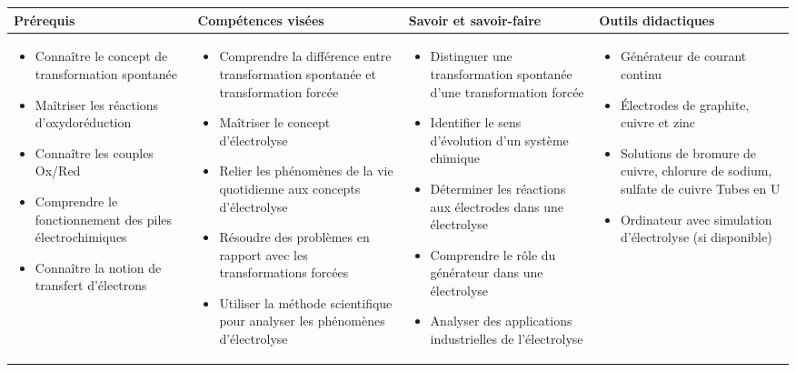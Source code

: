 \documentclass[12pt]{article}
\begin{document}
\begin{tabular}{|p{4.5cm}|p{4.5cm}|p{4.5cm}|p{3cm}|}
\hline
\rowcolor{lightblue}
  \textbf{Prérequis} & \textbf{Compétences visées}& \textbf{Savoir et savoir-faire} & \textbf{Outils didactiques} \\
\hline
\hline
\begin{itemize}[leftmargin=*]
  \item Connaître le concept de transformation spontanée
  \item Maîtriser les réactions d'oxydoréduction
  \item Connaître les couples Ox/Red
  \item Comprendre le fonctionnement des piles électrochimiques
  \item Connaître la notion de transfert d'électrons
\end{itemize}
&
\begin{itemize}[leftmargin=*]
  \item Comprendre la différence entre transformation spontanée et transformation forcée
  \item Maîtriser le concept d'électrolyse
  \item Relier les phénomènes de la vie quotidienne aux concepts d'électrolyse
  \item Résoudre des problèmes en rapport avec les transformations forcées
  \item Utiliser la méthode scientifique pour analyser les phénomènes d'électrolyse
\end{itemize} 
&
\begin{itemize}[leftmargin=*]
\item Distinguer une transformation spontanée d'une transformation forcée
\item Identifier le sens d'évolution d'un système chimique
\item Déterminer les réactions aux électrodes dans une électrolyse
\item Comprendre le rôle du générateur dans une électrolyse
\item Analyser des applications industrielles de l'électrolyse
\end{itemize}
&
\begin{itemize}[leftmargin=*]
  \item Générateur de courant continu
  \item Électrodes de graphite, cuivre et zinc
  \item Solutions de bromure de cuivre, chlorure de sodium, sulfate de cuivre
Tubes en U
      \item Ordinateur avec simulation d'électrolyse
(si disponible)
\end{itemize}

  \\
\hline
\end{tabular}
\end{document}
